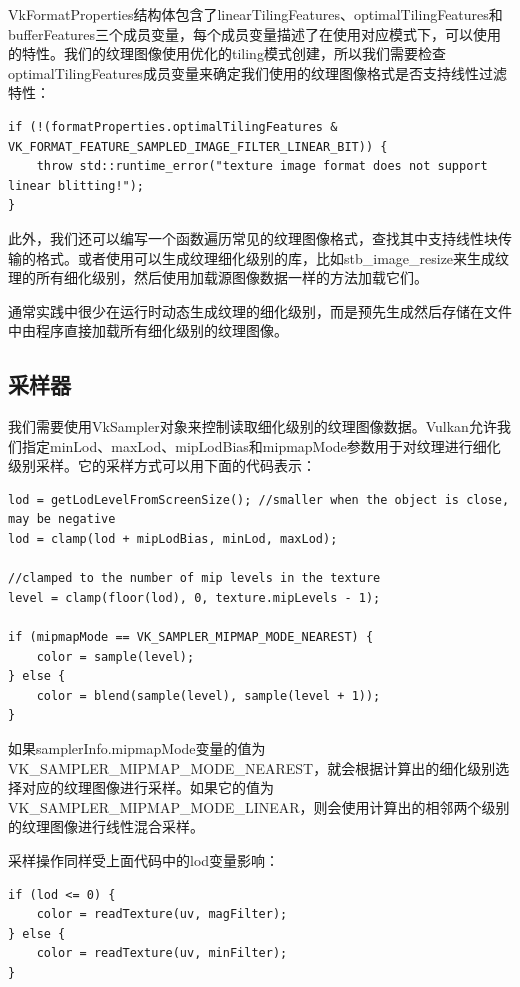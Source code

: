 \documentclass{ctexart}
\begin{document}
VkFormatProperties结构体包含了linearTilingFeatures、optimalTilingFeatures和bufferFeatures三个成员变量，每个成员变量描述了在使用对应模式下，可以使用的特性。我们的纹理图像使用优化的tiling模式创建，所以我们需要检查optimalTilingFeatures成员变量来确定我们使用的纹理图像格式是否支持线性过滤特性：

\begin{lstlisting}[language={[ANSI]C}]
if (!(formatProperties.optimalTilingFeatures & VK_FORMAT_FEATURE_SAMPLED_IMAGE_FILTER_LINEAR_BIT)) {
	throw std::runtime_error("texture image format does not support linear blitting!");
}
\end{lstlisting}

此外，我们还可以编写一个函数遍历常见的纹理图像格式，查找其中支持线性块传输的格式。或者使用可以生成纹理细化级别的库，比如stb\_image\_resize来生成纹理的所有细化级别，然后使用加载源图像数据一样的方法加载它们。

通常实践中很少在运行时动态生成纹理的细化级别，而是预先生成然后存储在文件中由程序直接加载所有细化级别的纹理图像。

\subsection{采样器}

我们需要使用VkSampler对象来控制读取细化级别的纹理图像数据。Vulkan允许我们指定minLod、maxLod、mipLodBias和mipmapMode参数用于对纹理进行细化级别采样。它的采样方式可以用下面的代码表示：

\begin{lstlisting}[language={[ANSI]C}]
lod = getLodLevelFromScreenSize(); //smaller when the object is close, may be negative
lod = clamp(lod + mipLodBias, minLod, maxLod);

//clamped to the number of mip levels in the texture
level = clamp(floor(lod), 0, texture.mipLevels - 1);

if (mipmapMode == VK_SAMPLER_MIPMAP_MODE_NEAREST) {
	color = sample(level);
} else {
	color = blend(sample(level), sample(level + 1));
}
\end{lstlisting}

如果samplerInfo.mipmapMode变量的值为VK\_SAMPLER\_MIPMAP\_MODE\_NEAREST，就会根据计算出的细化级别选择对应的纹理图像进行采样。如果它的值为VK\_SAMPLER\_MIPMAP\_MODE\_LINEAR，则会使用计算出的相邻两个级别的纹理图像进行线性混合采样。

采样操作同样受上面代码中的lod变量影响：

\begin{lstlisting}[language={[ANSI]C}]
if (lod <= 0) {
	color = readTexture(uv, magFilter);
} else {
	color = readTexture(uv, minFilter);
}
\end{lstlisting}
\end{document}
